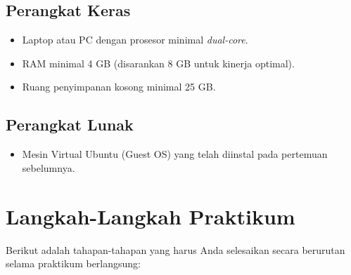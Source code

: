 \subsection{Perangkat Keras}
\begin{itemize}
	\item Laptop atau PC dengan prosesor minimal \textit{dual-core}.
	\item RAM minimal 4 GB (disarankan 8 GB untuk kinerja optimal).
	\item Ruang penyimpanan kosong minimal 25 GB.
\end{itemize}

\subsection{Perangkat Lunak}
\begin{itemize}
	\item Mesin Virtual Ubuntu (Guest OS) yang telah diinstal pada pertemuan sebelumnya.
\end{itemize}

\newpage
\section{Langkah-Langkah Praktikum}

Berikut adalah tahapan-tahapan yang harus Anda selesaikan secara berurutan selama praktikum berlangsung:

